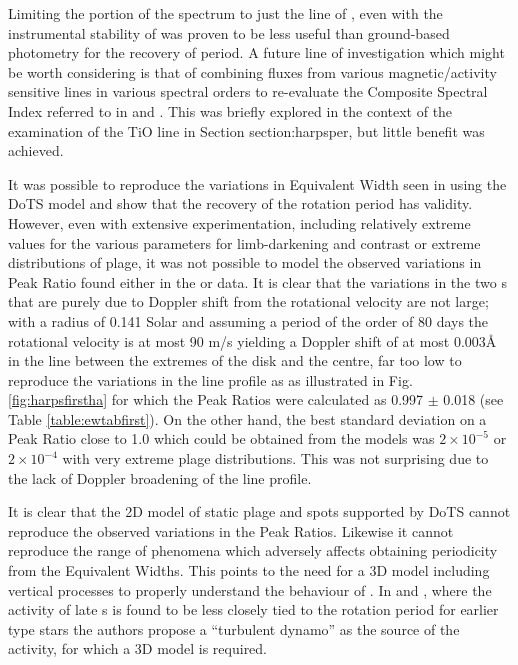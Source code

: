 Limiting the portion of the spectrum to just the {\ha} line of \prox, even with the instrumental stability of {\harps}
was proven to be less useful than {\asas} ground-based photometry for the recovery of period. A future line of
investigation which might be worth considering is that of combining fluxes from various magnetic/activity sensitive lines
in various spectral orders to re-evaluate the Composite Spectral Index referred to in \citet{hall99} and
\citet{hall00}. This was briefly explored in the context of the examination of the TiO line in Section
{section:harpsper}, but little benefit was achieved.

It was possible to reproduce the variations in Equivalent Width seen in {\prox} using the DoTS model and show that the
recovery of the rotation period has validity. However, even with extensive experimentation, including relatively extreme
values for the various parameters for limb-darkening and contrast or extreme distributions of plage, it was not possible
to model the observed variations in Peak Ratio found either in the {\uves} or {\harps} data. It is clear that the
variations in the two \horn s that are purely due to Doppler shift from the rotational velocity are not large; with a
radius of 0.141 Solar \citep{demory09} and assuming a period of the order of 80 days the rotational velocity is at most
90 m/s yielding a Doppler shift of at most 0.003{\AA} in the {\ha} line between the extremes of the disk and the centre,
far too low to reproduce the variations in the {\ha} line profile as as illustrated in Fig. \ref{fig:harpsfirstha} for
which the Peak Ratios were calculated as 0.997 $ \pm $ 0.018 (see Table \ref{table:ewtabfirst}). On the other hand, the
best standard deviation on a Peak Ratio close to 1.0 which could be obtained from the models was $2{\times}10^{-5}$ or
$2{\times}10^{-4}$ with very extreme plage distributions. This was not surprising due to the lack of Doppler broadening
of the line profile.

It is clear that the 2D model of static plage and spots supported by DoTS cannot reproduce the observed variations in
the Peak Ratios. Likewise it cannot reproduce the range of phenomena which adversely affects obtaining periodicity from
the Equivalent Widths. This points to the need for a 3D model including vertical processes to properly understand the
behaviour of \prox. In \citet{mohanty02} and \citet{mohanty03}, where the activity of late \rdwarf s is found to be less
closely tied to the rotation period for earlier type stars the authors propose a ``turbulent dynamo'' as the source of
the activity, for which a 3D model is required.

